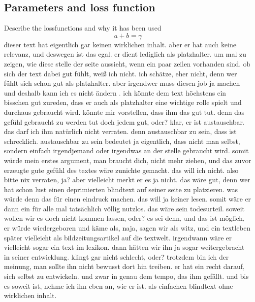 \documentclass[conference]{IEEEtran}
\begin{document}
\subsection{Parameters and loss function}
Describe the lossfunctions and why it has been used
\begin{equation}
a+b=\gamma\label{eq}
\end{equation}
dieser text hat eigentlich gar keinen wirklichen inhalt. aber er hat auch keine relevanz, und deswegen ist das egal. er dient lediglich als platzhalter. um mal zu zeigen, wie diese stelle der seite aussieht, wenn ein paar zeilen vorhanden sind. ob sich der text dabei gut fühlt, weiß ich nicht. ich schätze, eher nicht, denn wer fühlt sich schon gut als platzhalter. aber irgendwer muss diesen job ja machen und deshalb kann ich es nicht ändern . ich könnte dem text höchstens ein bisschen gut zureden, dass er auch als platzhalter eine wichtige rolle spielt und durchaus gebraucht wird. könnte mir vorstellen, dass ihm das gut tut. denn das gefühl gebraucht zu werden tut doch jedem gut, oder? klar, er ist austauschbar. das darf ich ihm natürlich nicht verraten. denn austauschbar zu sein, dass ist schrecklich. austauschbar zu sein bedeutet ja eigentlich, dass nicht man selbst, sondern einfach irgendjemand oder irgendwas an der stelle gebraucht wird. somit würde mein erstes argument, man braucht dich, nicht mehr ziehen, und das zuvor erzeugte gute gefühl des textes wäre zunichte gemacht. das will ich nicht. also bitte nix verraten, ja? aber vielleicht merkt er es ja nicht. das wäre gut, denn wer hat schon lust einen deprimierten blindtext auf seiner seite zu platzieren. was würde denn das für einen eindruck machen. das will ja keiner lesen. somit wäre er dann ein für alle mal tatsächlich völlig nutzlos. das wäre sein todesurteil. soweit wollen wir es doch nicht kommen lassen, oder? es sei denn, und das ist möglich, er würde wiedergeboren und käme als, naja, sagen wir als witz, und ein textleben später vielleicht als bildzeitungsartikel auf die textwelt. irgendwann wäre er vielleicht sogar ein text im lexikon. dann hätten wir ihn ja sogar weitergebracht in seiner entwicklung. klingt gar nicht schlecht, oder? trotzdem bin ich der meinung, man sollte ihn nicht bewusst dort hin treiben. er hat ein recht darauf, sich selbst zu entwickeln. und zwar in genau dem tempo, das ihm gefällt. und bis es soweit ist, nehme ich ihn eben an, wie er ist. als einfachen blindtext ohne wirklichen inhalt.
\end{document}
